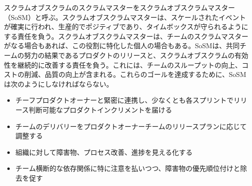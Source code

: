 \documentclass[12pt,a4paper,parskip=full]{scrartcl}
\begin{document}

スクラムオブスクラムのスクラムマスターをスクラムオブスクラムマスター（SoSM）と呼ぶ。スクラムオブスクラムマスターは、スケールされたイベントが確実に行われ、生産的でポジティブであり、タイムボックスが守られるようにする責任を負う。スクラムオブスクラムマスターは、チームのスクラムマスターがなる場合もあれば、この役割に特化した個人の場合もある。SoSMは、共同チームの努力の結果であるプロダクトのリリースと、スクラムオブスクラムの有効性を継続的に改善する責任を負う。これには、チームのスループットの向上、コストの削減、品質の向上が含まれる。これらのゴールを達成するために、SoSMは次のようにしなければならない。

\begin{itemize}
\itemsep1pt\parskip0pt

\item
チーフプロダクトオーナーと緊密に連携し、少なくとも各スプリントでリリース判断可能なプロダクトインクリメントを届ける
\item
チームのデリバリーをプロダクトオーナーチームのリリースプランに応じて調整する
\item
組織に対して障害物、プロセス改善、進捗を見える化する
\item
チーム横断的な依存関係に特に注意を払いつつ、障害物の優先順位付けと除去を促す
\end{itemize}
\end{document}
